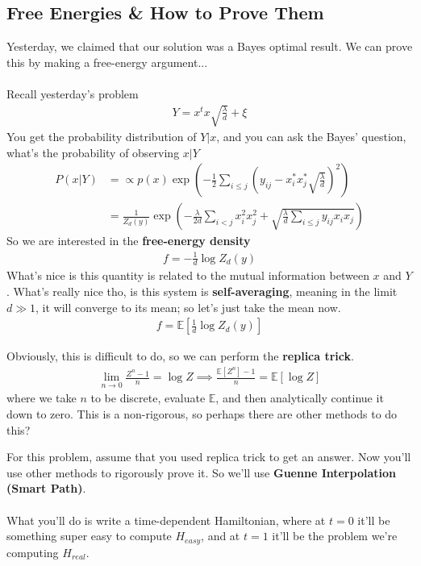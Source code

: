 \subsection{Free Energies \& How to Prove Them}
Yesterday, we claimed that our solution was a Bayes optimal result. We can prove this by making a free-energy argument...\\
\\
Recall yesterday's problem
\begin{align}
	Y = x^t x \sqrt{\frac{\lambda}{d}} + \xi
\end{align}
You get the probability distribution of $Y | x$, and you can ask the Bayes' question, what's the probability of observing $x | Y$
\begin{align}
	P(x | Y)  & = \propto p(x) \exp \left(- \frac{1}{2} \sum_{i \leq j} (y_{ij} - x_i^* x_j^* \sqrt{\frac{\lambda}{d}})^2 \right)\\
	&= \frac{1}{Z_d(y)} \exp\left (-\frac{\lambda}{2d} \sum_{i < j} x_i^2 x_j^2 + \sqrt{\frac{\lambda}{d} \sum_{i \leq j } y_{ij} x_i x_j} \right)
\end{align}
So we are interested in the \textbf{free-energy density}
\begin{align}
	f = - \frac{1}{d} \log Z_d(y)
\end{align}
What's nice is this quantity is related to the mutual information between $x$ and $Y$. What's really nice  tho, is this system is \textbf{self-averaging}, meaning in the limit $d \gg 1$, it will converge to its mean; so let's just take the mean now.
\begin{align}
	f = \mathbb E \left[ \frac{1}{d} \log Z_d(y) \right]
\end{align}
\begin{sidework}
	Obviously, this is difficult to do, so we can perform the \textbf{replica trick}.
\begin{align}
	\lim_{n \to 0} \frac{Z^n - 1}{n} = \log Z \implies \frac{\mathbb E[Z^n] - 1}{n} = \mathbb E[\log Z]
\end{align}
where we take $n$ to be discrete, evaluate $\mathbb E$, and then analytically continue it down to zero. This is a non-rigorous, so perhaps there are other methods to do this?
\end{sidework}
For this problem, assume that you used replica trick to get an answer. Now you'll use other methods to rigorously prove it. So we'll use \textbf{Guenne Interpolation (Smart Path)}.
\\
\\
What you'll do is write a time-dependent Hamiltonian, where at $t = 0$ it'll be something super easy to compute $H_{easy}$, and at $t = 1$ it'll be the problem we're computing $H_{real}$.
